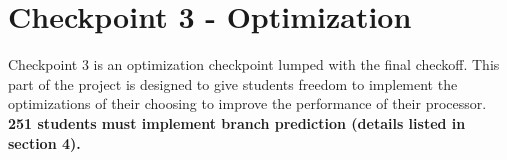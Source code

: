\documentclass[11pt]{article}
\begin{document}



\newpage
\section{Checkpoint 3 - Optimization}

Checkpoint 3 is an optimization checkpoint lumped with the final checkoff.
This part of the project is designed to give students freedom to implement the optimizations of their choosing to improve the performance of their processor.
\textbf{251 students must implement branch prediction (details listed in section 4).}
\end{document}
